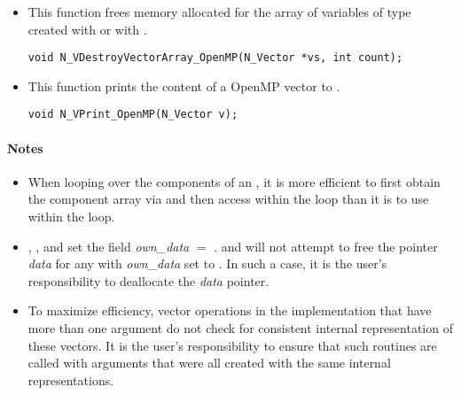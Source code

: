\begin{itemize}
\item {}

 This function frees memory allocated for the array of  variables of type
  created with  or with
 .

 

 \verb|void N_VDestroyVectorArray_OpenMP(N_Vector *vs, int count);|


\item {}

 This function prints the content of a OpenMP vector to .

 
 
 \verb|void N_VPrint_OpenMP(N_Vector v);|

\end{itemize}
\paragraph{\bf Notes}                                                      
           
\begin{itemize}
                                        
\item
  When looping over the components of an  , it is     
  more efficient to first obtain the component array via       
   and then access  within the     
  loop than it is to use  within the loop.        

\item
  {\warn}, , 
  and  set the field 
  {\em own\_data} $=$ . 
   and 
  will not attempt to free the pointer {\em data} for any  with
  {\em own\_data} set to . In such a case, it is the user's responsibility to
  deallocate the {\em data} pointer.
                                     
\item
  {\warn}To maximize efficiency, vector operations in the {\nvecopenmp} implementation
  that have more than one  argument do not check for
  consistent internal representation of these vectors. It is the user's 
  responsibility to ensure that such routines are called with 
  arguments that were all created with the same internal representations.

\end{itemize}

